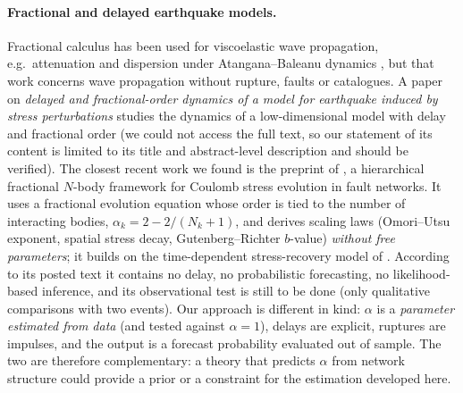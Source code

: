\documentclass[10pt,a4paper]{article}
\begin{document}
\paragraph{Fractional and delayed earthquake models.}
Fractional calculus has been used for viscoelastic wave propagation, e.g.\ attenuation and dispersion under Atangana--Baleanu dynamics \citep{DemirKocyigit2025}, but that work concerns wave propagation without rupture, faults or catalogues. A paper on \emph{delayed and fractional-order dynamics of a model for earthquake induced by stress perturbations} \citep{PhysScr2024} studies the dynamics of a low-dimensional model with delay and fractional order (we could not access the full text, so our statement of its content is limited to its title and abstract-level description and should be verified). The closest recent work we found is the preprint of \citet{Chishtie2026}, a hierarchical fractional $N$-body framework for Coulomb stress evolution in fault networks. It uses a fractional evolution equation whose order is tied to the number of interacting bodies, $\alpha_k=2-2/(N_k+1)$, and derives scaling laws (Omori--Utsu exponent, spatial stress decay, Gutenberg--Richter $b$-value) \emph{without free parameters}; it builds on the time-dependent stress-recovery model of \citet{DahmHainzl2022}. According to its posted text it contains no delay, no probabilistic forecasting, no likelihood-based inference, and its observational test is still to be done (only qualitative comparisons with two events). Our approach is different in kind: $\alpha$ is a \emph{parameter estimated from data} (and tested against $\alpha=1$), delays are explicit, ruptures are impulses, and the output is a forecast probability evaluated out of sample. The two are therefore complementary: a theory that predicts $\alpha$ from network structure could provide a prior or a constraint for the estimation developed here.
\end{document}
